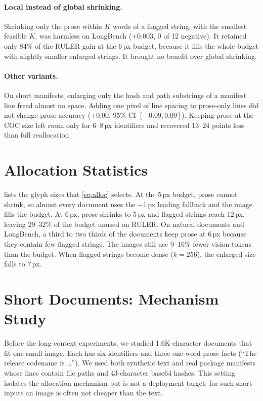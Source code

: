 \paragraph{Local instead of global shrinking.}
Shrinking only the prose within $K$ words of a flagged string, with the smallest feasible $K$, was harmless on LongBench ($+$0.003, 0 of 12 negative).
It retained only 84\% of the RULER gain at the 6\,px budget, because it fills the whole budget with slightly smaller enlarged strings.
It brought no benefit over global shrinking.

\paragraph{Other variants.}
On short manifests, enlarging only the hash and path substrings of a manifest line freed almost no space.
Adding one pixel of line spacing to prose-only lines did not change prose accuracy ($+$0.00, 95\% CI $[-0.09,0.09]$).
Keeping prose at the COC size left room only for 6--8\,px identifiers and recovered 13--24 points less than full reallocation.

\section{Allocation Statistics}
\label{app:alloc}

 lists the glyph sizes that \cref{eq:alloc} selects.
At the 5\,px budget, prose cannot shrink, so almost every document uses the $-$1\,px leading fallback and the image fills the budget.
At 6\,px, prose shrinks to 5\,px and flagged strings reach 12\,px, leaving 29--32\% of the budget unused on RULER.
On natural documents and LongBench, a third to two thirds of the documents keep prose at 6\,px because they contain few flagged strings.
The images still use 9--16\% fewer vision tokens than the budget.
When flagged strings become dense ($k{=}256$), the enlarged size falls to 7\,px.



\section{Short Documents: Mechanism Study}
\label{app:short}

Before the long-context experiments, we studied 1.6K-character documents that fit one small image.
Each has six identifiers and three one-word prose facts (``The release codename is \ldots'').
We used both synthetic text and real package manifests whose lines contain file paths and 43-character base64 hashes.
This setting isolates the allocation mechanism but is not a deployment target: for such short inputs an image is often not cheaper than the text.

